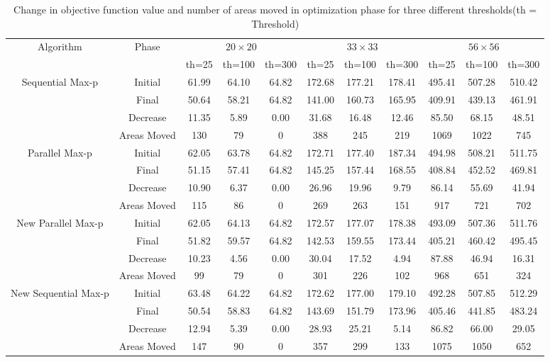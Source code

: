 \documentclass[conference]{IEEEtran}
\begin{document}
\begin{table}[!htbp]
\begin{center}
\begin{tabular}{|c|c|c|c|c|c|c|c|c|c|c|}
\hline 
\multirow{2}{*}{Algorithm}&\multirow{2}{*}{Phase} & \multicolumn{3}{|c|}{$20\times 20$} & \multicolumn{3}{|c|}{$33\times33$} & \multicolumn{3}{|c|}{$56\times56$}\\
\cline{3-11}
	& & th=25 & th=100 & th=300  & th=25 & th=100 & th=300  & th=25 & th=100 & th=300\\
\cline{1-11}
\multirow{3}{*}{Sequential Max-p}& Initial  & 61.99& 64.10 & 64.82 & 172.68 & 177.21 &178.41 &495.41 &507.28 &510.42 \\
\cline{2-11}
 & Final& 50.64 & 58.21 & 64.82 & 141.00 & 160.73 &165.95 &409.91 &439.13 &461.91 \\
\cline{2-11}
 & Decrease& 11.35 & 5.89 & 0.00 & 31.68 & 16.48 &12.46 &85.50 &68.15 &48.51\\
\cline{2-11}
 & Areas Moved& 130 & 79 & 0 & 388 & 245 &219 &1069 &1022 &745\\
\hline
\hline

\multirow{4}{*}{Parallel Max-p}  &Initial  & 62.05& 63.78 & 64.82 & 172.71 & 177.40 &187.34 &494.98 &508.21 &511.75 \\
\cline{2-11}
 & Final& 51.15 & 57.41 & 64.82 & 145.25 & 157.44 &168.55 &408.84 &452.52 &469.81 \\
\cline{2-11}
 & Decrease& 10.90 & 6.37 & 0.00 & 26.96 & 19.96 &9.79 &86.14 &55.69 &41.94\\
\cline{2-11}
 & Areas Moved& 115 & 86 & 0 & 269 & 263 &151 &917 &721 &702\\
\hline
\hline

\multirow{4}{*}{New Parallel Max-p} &Initial  & 62.05& 64.13 & 64.82 & 172.57 & 177.07 &178.38 &493.09 &507.36 &511.76 \\
\cline{2-11}
 & Final& 51.82 & 59.57 & 64.82 & 142.53 & 159.55 &173.44 &405.21 &460.42 &495.45 \\
\cline{2-11}
 & Decrease& 10.23 & 4.56 & 0.00 & 30.04 & 17.52 &4.94 &87.88 &46.94 &16.31\\
\cline{2-11}
 & Areas Moved& 99 & 79 & 0 & 301 & 226 &102 &968 &651 &324\\
\hline
\hline

\multirow{4}{*}{New Sequential Max-p} &Initial  & 63.48& 64.22 & 64.82 & 172.62 & 177.00 &179.10 &492.28 &507.85 &512.29 \\
\cline{2-11}
 & Final& 50.54 & 58.83 & 64.82 & 143.69 & 151.79 &173.96 &405.46 &441.85 &483.24 \\
\cline{2-11}
 & Decrease& 12.94 & 5.39 & 0.00 & 28.93 & 25.21 &5.14 &86.82 &66.00 &29.05\\
\cline{2-11}
 & Areas Moved& 147 & 90 & 0 & 357 & 299 &133 &1075 &1050 &652\\
\hline

\end{tabular}
\caption{Change in objective function value and number of areas moved in optimization phase for three different thresholds(th = Threshold)}
\label{tab:tab7}
\end{center}
\end{table}
\end{document}
